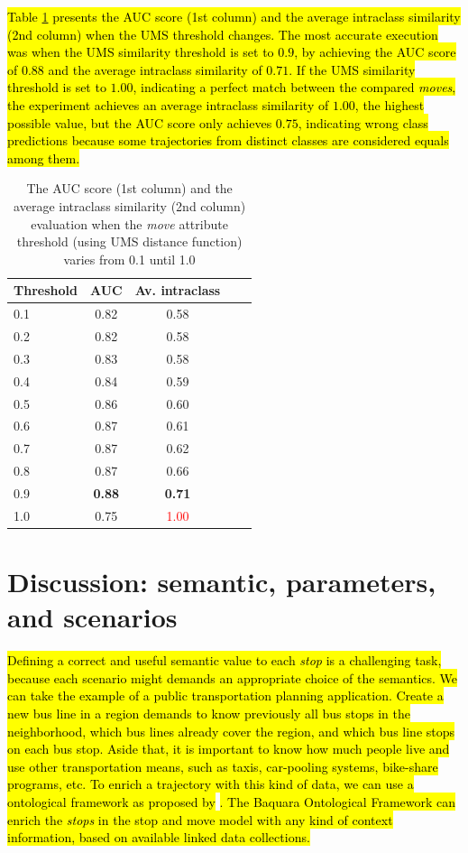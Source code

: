 \documentclass[12pt]{article}
\begin{document}
\hl{Table {\ref{tab:sensibility_movement_thresholds}} presents the AUC score (1st column) and the average intraclass similarity (2nd column) when the UMS threshold changes. The most accurate execution was when the UMS similarity threshold is set to $0.9$, by achieving the AUC score of $0.88$ and the average intraclass similarity of $0.71$. If the UMS similarity threshold is set to $1.00$, indicating a perfect match between the compared \emph{moves}, the experiment achieves an average intraclass similarity of $1.00$, the highest possible value, but the AUC score only achieves $0.75$, indicating wrong class predictions because some trajectories from distinct classes are considered equals among them.}


\begin{table}[ht!]
  \scriptsize
  \centering
  \begin{tabular}{|l|c|c|c|c|}
  	\hline
Threshold & AUC & Av. intraclass\\
  	\hline
0.1 & 0.82 & 0.58\\
0.2 & 0.82 & 0.58\\
0.3 & 0.83 & 0.58\\
0.4 & 0.84 & 0.59\\
0.5 & 0.86 & 0.60\\
0.6 & 0.87 & 0.61\\
0.7 & 0.87 & 0.62\\
0.8 & 0.87 & 0.66\\
0.9 & \textbf{0.88} & \textbf{0.71}\\
1.0 & 0.75 & \textcolor{red}{1.00}\\
    \hline
  \end{tabular}
  \caption{The AUC score (1st column) and the average intraclass similarity (2nd column) evaluation when the \emph{move} attribute threshold (using UMS distance function) varies from 0.1 until 1.0}
  \label{tab:sensibility_movement_thresholds}
\end{table}

\section{Discussion: semantic, parameters, and scenarios}
\hl{
Defining a correct and useful semantic value to each \emph{stop} is a challenging task, because each scenario might demands an appropriate choice of the semantics. 
We can take the example of a public transportation planning application. Create a new bus line in a region demands to know previously all bus stops in the neighborhood, which bus lines already cover the region, and which bus line stops on each bus stop. Aside that, it is important to know how much people live and use other transportation means, such as taxis, car-pooling systems, bike-share programs, etc. To enrich a trajectory with this kind of data, we can use a ontological framework as proposed by } \cite{fileto2013baquara}\hl{. The Baquara Ontological Framework can enrich the \emph{stops} in the stop and move model with any kind of context information, based on available linked data collections.} 
\end{document}

